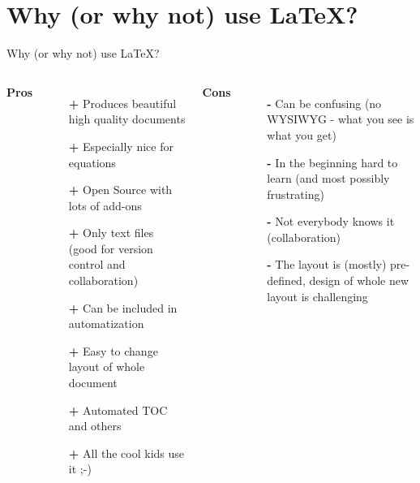 \documentclass[presentation, aspectratio=1610]{beamer}
\begin{document}
	\section{Why (or why not) use \LaTeX ?}
	\begin{frame}{Why (or why not) use \LaTeX ?}
	\begin{columns}
		{\large \color{green}\textbf{Pros}}
		\begin{itemize}
			\item [\color{green}\textbf{+}] Produces beautiful high quality documents
			\item [\color{green}\textbf{+}] Especially nice for equations
			\item [\color{green}\textbf{+}] Open Source with lots of add-ons
			\item [\color{green}\textbf{+}] Only text files (good for version control and
			collaboration)
			\item [\color{green}\textbf{+}] Can be included in automatization
			\item[\color{green}\textbf{+}] \color{gray} Easy to change layout of whole document
			\item[\color{green}\textbf{+}] Automated TOC and others
			\item[\color{green}\textbf{+}] All the cool kids use it ;-)
		\end{itemize}
	\pause
			{\large \color{red}\textbf{Cons}}
		\begin{itemize}
			\item [\color{red}\textbf{-}] Can be confusing (no WYSIWYG - what you see is what you get)
			\item [\color{red}\textbf{-}] In the beginning hard to learn (and most possibly frustrating)
			\item [\color{red}\textbf{-}] Not everybody knows it (collaboration)
			\item [\color{red}\textbf{-}] The layout is (mostly) pre-defined, design of whole new
			layout is challenging
		\end{itemize}
	\end{columns}
	\end{frame}
\end{document}
